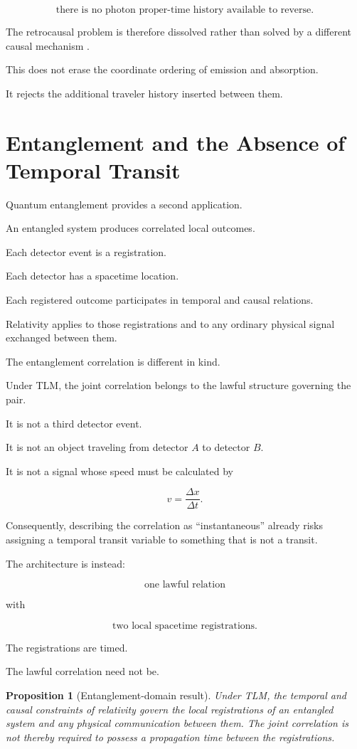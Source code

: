 \documentclass[12pt,onecolumn]{article}
\theoremstyle{plain}
\newtheorem{proposition}{Proposition}
\theoremstyle{definition}
\theoremstyle{remark}
\begin{document}
\[
\boxed{
\text{there is no photon proper-time history available to reverse}.
}
\]

The retrocausal problem is therefore dissolved rather than solved by a
different causal mechanism \cite{retrocausality}.

This does not erase the coordinate ordering of emission and absorption.

It rejects the additional traveler history inserted between them.


\section{Entanglement and the Absence of Temporal Transit}

Quantum entanglement provides a second application.

An entangled system produces correlated local outcomes.

Each detector event is a registration.

Each detector has a spacetime location.

Each registered outcome participates in temporal and causal relations.

Relativity applies to those registrations and to any ordinary physical
signal exchanged between them.

The entanglement correlation is different in kind.

Under TLM, the joint correlation belongs to the lawful structure governing
the pair.

It is not a third detector event.

It is not an object traveling from detector \(A\) to detector \(B\).

It is not a signal whose speed must be calculated by

\[
v=\frac{\Delta x}{\Delta t}.
\]

Consequently, describing the correlation as ``instantaneous'' already
risks assigning a temporal transit variable to something that is not a
transit.

The architecture is instead:

\[
\boxed{
\text{one lawful relation}
}
\]

with

\[
\boxed{
\text{two local spacetime registrations}.
}
\]

The registrations are timed.

The lawful correlation need not be.

\begin{proposition}[Entanglement-domain result]
\label{prop:entanglement}
Under TLM, the temporal and causal constraints of relativity govern the
local registrations of an entangled system and any physical communication
between them. The joint correlation is not thereby required to possess a
propagation time between the registrations.
\end{proposition}
\end{document}
